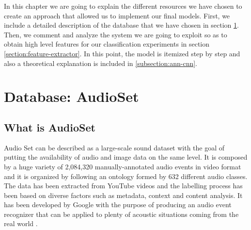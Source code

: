



	In this chapter we are going to explain the different resources we have chosen to create an approach that allowed us to implement our final models. First, we include a detailed description of the database that we have chosen in section \ref{section:audioset}. Then, we comment and analyze the system we are going to exploit so as to obtain high level features for our classification experiments in section \ref{section:feature-extractor}. In this point, the model is itemized step by step and also a theoretical explanation is included in \ref{subsection:ann-cnn}.
	
	
\section{Database: AudioSet}
\label{section:audioset}

\subsection{What is AudioSet} 
\label{subsection:what-is-audioset}

	Audio Set can be described as a large-scale sound dataset with the goal of putting the availability of audio and image data on the same level. It is composed by a huge variety of 2,084,320 manually-annotated audio events in video format and it is organized by following an ontology formed by 632 different audio classes. The data has been extracted from YouTube videos and the labelling process has been based on diverse factors such as metadata, context and content analysis. It has been developed by Google with the purpose of producing an audio event recognizer that can be applied to plenty of acoustic situations coming from the real world \cite{Gemmeke2017}.
	
